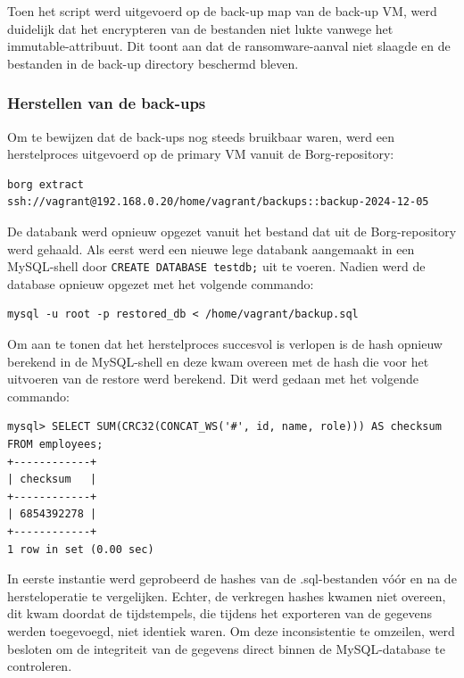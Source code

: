 Toen het script werd uitgevoerd op de back-up map van de back-up VM, werd duidelijk dat het encrypteren van de bestanden niet lukte vanwege het immutable-attribuut. Dit toont aan dat de ransomware-aanval niet slaagde en de bestanden in de back-up directory beschermd bleven.

\subsubsection{Herstellen van de back-ups}
Om te bewijzen dat de back-ups nog steeds bruikbaar waren, werd een herstelproces uitgevoerd op de primary VM vanuit de Borg-repository:
\begin{lstlisting}[language=script, caption={Borg commando om een back-up te herstellen}]
borg extract 
ssh://vagrant@192.168.0.20/home/vagrant/backups::backup-2024-12-05
\end{lstlisting}

De databank werd opnieuw opgezet vanuit het bestand dat uit de Borg-repository werd gehaald. Als eerst werd een nieuwe lege databank aangemaakt in een MySQL-shell door \texttt{CREATE DATABASE testdb;} uit te voeren. Nadien werd de database opnieuw opgezet met het volgende commando:
\begin{lstlisting}[language=script, caption={MySQL commando om een databank te herstellen vanuit een .sql-bestand}]
mysql -u root -p restored_db < /home/vagrant/backup.sql
\end{lstlisting}
Om aan te tonen dat het herstelproces succesvol is verlopen is de hash opnieuw berekend in de MySQL-shell en deze kwam overeen met de hash die voor het uitvoeren van de restore werd berekend. Dit werd gedaan met het volgende commando:
\begin{lstlisting}[language=script, caption={MySQL commando om de hash van de tabel te berekenen na de restore.}]
mysql> SELECT SUM(CRC32(CONCAT_WS('#', id, name, role))) AS checksum FROM employees;
+------------+
| checksum   |
+------------+
| 6854392278 |
+------------+
1 row in set (0.00 sec)
\end{lstlisting}
In eerste instantie werd geprobeerd de hashes van de .sql-bestanden vóór en na de hersteloperatie te vergelijken. Echter, de verkregen hashes kwamen niet overeen, dit kwam doordat de tijdstempels, die tijdens het exporteren van de gegevens werden toegevoegd, niet identiek waren. Om deze inconsistentie te omzeilen, werd besloten om de integriteit van de gegevens direct binnen de MySQL-database te controleren.

